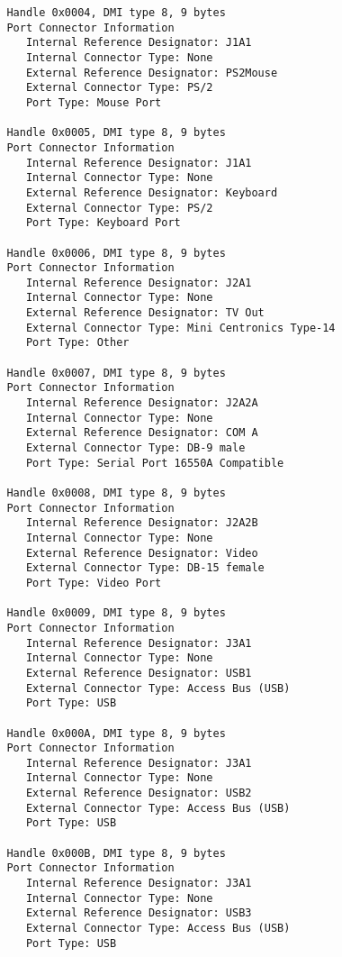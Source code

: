 \documentclass[11pt]{article}
\begin{document}
\begin{tiny}
\begin{verbatim}
         Handle 0x0004, DMI type 8, 9 bytes
         Port Connector Information
            Internal Reference Designator: J1A1
            Internal Connector Type: None
            External Reference Designator: PS2Mouse
            External Connector Type: PS/2
            Port Type: Mouse Port
         
         Handle 0x0005, DMI type 8, 9 bytes
         Port Connector Information
            Internal Reference Designator: J1A1
            Internal Connector Type: None
            External Reference Designator: Keyboard
            External Connector Type: PS/2
            Port Type: Keyboard Port
         
         Handle 0x0006, DMI type 8, 9 bytes
         Port Connector Information
            Internal Reference Designator: J2A1
            Internal Connector Type: None
            External Reference Designator: TV Out
            External Connector Type: Mini Centronics Type-14
            Port Type: Other
         
         Handle 0x0007, DMI type 8, 9 bytes
         Port Connector Information
            Internal Reference Designator: J2A2A
            Internal Connector Type: None
            External Reference Designator: COM A
            External Connector Type: DB-9 male
            Port Type: Serial Port 16550A Compatible
         
         Handle 0x0008, DMI type 8, 9 bytes
         Port Connector Information
            Internal Reference Designator: J2A2B
            Internal Connector Type: None
            External Reference Designator: Video
            External Connector Type: DB-15 female
            Port Type: Video Port
         
         Handle 0x0009, DMI type 8, 9 bytes
         Port Connector Information
            Internal Reference Designator: J3A1
            Internal Connector Type: None
            External Reference Designator: USB1
            External Connector Type: Access Bus (USB)
            Port Type: USB
         
         Handle 0x000A, DMI type 8, 9 bytes
         Port Connector Information
            Internal Reference Designator: J3A1
            Internal Connector Type: None
            External Reference Designator: USB2
            External Connector Type: Access Bus (USB)
            Port Type: USB
         
         Handle 0x000B, DMI type 8, 9 bytes
         Port Connector Information
            Internal Reference Designator: J3A1
            Internal Connector Type: None
            External Reference Designator: USB3
            External Connector Type: Access Bus (USB)
            Port Type: USB
         

\end{verbatim}
\end{tiny}
\end{document}
